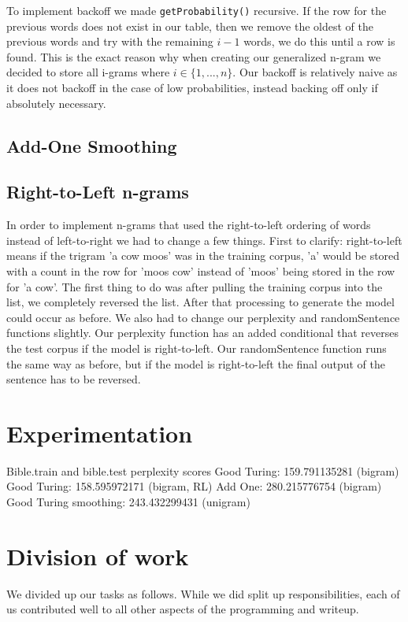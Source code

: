 \documentclass{article}
\begin{document}
To implement backoff we made \texttt{getProbability()} recursive. If the row for the previous words does not exist in our table, then we remove the oldest of the previous words and try with the remaining $i-1$ words, we do this until a row is found. This is the exact reason why when creating our generalized n-gram we decided to store all i-grams where $i \in \lbrace 1,...,n \rbrace$. Our backoff is relatively naive as it does not backoff in the case of low probabilities, instead backing off only if absolutely necessary.

\subsection{Add-One Smoothing} %

\subsection{Right-to-Left n-grams}

In order to implement n-grams that used the right-to-left ordering of words instead of left-to-right we had to change a few things. First to clarify: right-to-left means if the trigram 'a cow moos' was in the training corpus, 'a' would be stored with a count in the row for 'moos cow' instead of 'moos' being stored in the row for 'a cow'. The first thing to do was after pulling the training corpus into the list, we completely reversed the list. After that processing to generate the model could occur as before. We also had to change our perplexity and randomSentence functions slightly. Our perplexity function has an added conditional that reverses the test corpus if the model is right-to-left. Our randomSentence function runs the same way as before, but if the model is right-to-left the final output of the sentence has to be reversed.

\section{Experimentation}

Bible.train and bible.test perplexity scores 
Good Turing: 159.791135281 (bigram)
Good Turing: 158.595972171 (bigram, RL)
Add One: 280.215776754 (bigram)
Good Turing smoothing: 243.432299431 (unigram)

\section{Division of work}
We divided up our tasks as follows. While we did split up responsibilities, each of us contributed well to all other aspects of the programming and writeup.
\end{document}
